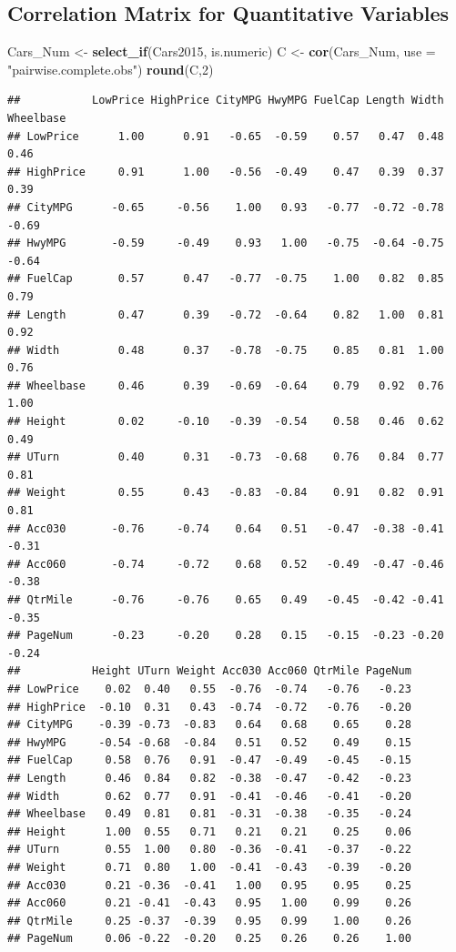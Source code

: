 \documentclass[]{book}
\newenvironment{Shaded}{\begin{snugshade}}{\end{snugshade}}
\newcommand{\KeywordTok}[1]{\textcolor[rgb]{0.13,0.29,0.53}{\textbf{#1}}}
\newcommand{\DataTypeTok}[1]{\textcolor[rgb]{0.13,0.29,0.53}{#1}}
\newcommand{\DecValTok}[1]{\textcolor[rgb]{0.00,0.00,0.81}{#1}}
\newcommand{\StringTok}[1]{\textcolor[rgb]{0.31,0.60,0.02}{#1}}
\newcommand{\NormalTok}[1]{#1}
\begin{document}
\subsection{Correlation Matrix for Quantitative
Variables}\label{correlation-matrix-for-quantitative-variables}

\begin{Shaded}
\begin{Highlighting}[]
\NormalTok{Cars_Num <-}\StringTok{ }\KeywordTok{select_if}\NormalTok{(Cars2015, is.numeric)}
\NormalTok{C <-}\StringTok{ }\KeywordTok{cor}\NormalTok{(Cars_Num, }\DataTypeTok{use =} \StringTok{"pairwise.complete.obs"}\NormalTok{)}
\KeywordTok{round}\NormalTok{(C,}\DecValTok{2}\NormalTok{)}
\end{Highlighting}
\end{Shaded}

\begin{verbatim}
##           LowPrice HighPrice CityMPG HwyMPG FuelCap Length Width Wheelbase
## LowPrice      1.00      0.91   -0.65  -0.59    0.57   0.47  0.48      0.46
## HighPrice     0.91      1.00   -0.56  -0.49    0.47   0.39  0.37      0.39
## CityMPG      -0.65     -0.56    1.00   0.93   -0.77  -0.72 -0.78     -0.69
## HwyMPG       -0.59     -0.49    0.93   1.00   -0.75  -0.64 -0.75     -0.64
## FuelCap       0.57      0.47   -0.77  -0.75    1.00   0.82  0.85      0.79
## Length        0.47      0.39   -0.72  -0.64    0.82   1.00  0.81      0.92
## Width         0.48      0.37   -0.78  -0.75    0.85   0.81  1.00      0.76
## Wheelbase     0.46      0.39   -0.69  -0.64    0.79   0.92  0.76      1.00
## Height        0.02     -0.10   -0.39  -0.54    0.58   0.46  0.62      0.49
## UTurn         0.40      0.31   -0.73  -0.68    0.76   0.84  0.77      0.81
## Weight        0.55      0.43   -0.83  -0.84    0.91   0.82  0.91      0.81
## Acc030       -0.76     -0.74    0.64   0.51   -0.47  -0.38 -0.41     -0.31
## Acc060       -0.74     -0.72    0.68   0.52   -0.49  -0.47 -0.46     -0.38
## QtrMile      -0.76     -0.76    0.65   0.49   -0.45  -0.42 -0.41     -0.35
## PageNum      -0.23     -0.20    0.28   0.15   -0.15  -0.23 -0.20     -0.24
##           Height UTurn Weight Acc030 Acc060 QtrMile PageNum
## LowPrice    0.02  0.40   0.55  -0.76  -0.74   -0.76   -0.23
## HighPrice  -0.10  0.31   0.43  -0.74  -0.72   -0.76   -0.20
## CityMPG    -0.39 -0.73  -0.83   0.64   0.68    0.65    0.28
## HwyMPG     -0.54 -0.68  -0.84   0.51   0.52    0.49    0.15
## FuelCap     0.58  0.76   0.91  -0.47  -0.49   -0.45   -0.15
## Length      0.46  0.84   0.82  -0.38  -0.47   -0.42   -0.23
## Width       0.62  0.77   0.91  -0.41  -0.46   -0.41   -0.20
## Wheelbase   0.49  0.81   0.81  -0.31  -0.38   -0.35   -0.24
## Height      1.00  0.55   0.71   0.21   0.21    0.25    0.06
## UTurn       0.55  1.00   0.80  -0.36  -0.41   -0.37   -0.22
## Weight      0.71  0.80   1.00  -0.41  -0.43   -0.39   -0.20
## Acc030      0.21 -0.36  -0.41   1.00   0.95    0.95    0.25
## Acc060      0.21 -0.41  -0.43   0.95   1.00    0.99    0.26
## QtrMile     0.25 -0.37  -0.39   0.95   0.99    1.00    0.26
## PageNum     0.06 -0.22  -0.20   0.25   0.26    0.26    1.00
\end{verbatim}
\end{document}
